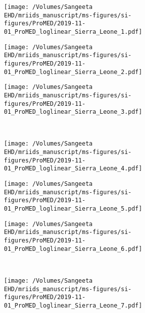 \documentclass[9pt,twoside,lineno]{pnas-new}
\begin{document}
\begin{figure}
  \centering
\begin{subfigure}[b]{0.3\textwidth}
  \texttt{[image: /Volumes/Sangeeta
    EHD/mriids\_manuscript/ms-figures/si-figures/ProMED/2019-11-01\_ProMED\_loglinear\_Sierra\_Leone\_1.pdf]}
\end{subfigure} \hfill
\begin{subfigure}[b]{0.3\textwidth}
  \texttt{[image: /Volumes/Sangeeta
    EHD/mriids\_manuscript/ms-figures/si-figures/ProMED/2019-11-01\_ProMED\_loglinear\_Sierra\_Leone\_2.pdf]}
\end{subfigure} \hfill
\begin{subfigure}[b]{0.3\textwidth}
  \texttt{[image: /Volumes/Sangeeta
    EHD/mriids\_manuscript/ms-figures/si-figures/ProMED/2019-11-01\_ProMED\_loglinear\_Sierra\_Leone\_3.pdf]} 
\end{subfigure} \hfill
\\
\begin{subfigure}[b]{0.3\textwidth}
  \texttt{[image: /Volumes/Sangeeta
    EHD/mriids\_manuscript/ms-figures/si-figures/ProMED/2019-11-01\_ProMED\_loglinear\_Sierra\_Leone\_4.pdf]}
\end{subfigure} \hfill
\begin{subfigure}[b]{0.3\textwidth}
  \texttt{[image: /Volumes/Sangeeta
    EHD/mriids\_manuscript/ms-figures/si-figures/ProMED/2019-11-01\_ProMED\_loglinear\_Sierra\_Leone\_5.pdf]}
\end{subfigure} \hfill
\begin{subfigure}[b]{0.3\textwidth}
  \texttt{[image: /Volumes/Sangeeta
    EHD/mriids\_manuscript/ms-figures/si-figures/ProMED/2019-11-01\_ProMED\_loglinear\_Sierra\_Leone\_6.pdf]}
\end{subfigure} \hfill%
\\
\begin{subfigure}[t]{0.3\textwidth}
  \texttt{[image: /Volumes/Sangeeta
    EHD/mriids\_manuscript/ms-figures/si-figures/ProMED/2019-11-01\_ProMED\_loglinear\_Sierra\_Leone\_7.pdf]}
\end{subfigure} \hfill
\begin{subfigure}[t]{0.3\textwidth}
\end{subfigure} \hfill
\begin{subfigure}[t]{0.3\textwidth}
\end{subfigure} \hfill


\end{figure}
\end{document}
